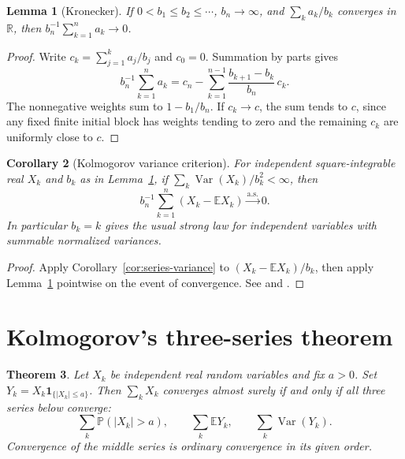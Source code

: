 \documentclass[11pt,oneside,openany]{book}
\newcommand{\Prob}{\mathbb{P}}
\newcommand{\E}{\mathbb{E}}
\newcommand{\R}{\mathbb{R}}
\DeclareMathOperator{\Var}{Var}
\newcommand{\ind}{\mathbf{1}}
\newcommand{\asto}{\xrightarrow{\mathrm{a.s.}}}
\theoremstyle{plain}
\newtheorem{theorem}{Theorem}[chapter]
\newtheorem{lemma}[theorem]{Lemma}
\newtheorem{corollary}[theorem]{Corollary}
\theoremstyle{definition}
\theoremstyle{remark}
\begin{document}
\begin{lemma}[Kronecker]\label{lem:kronecker}
If \(0<b_1\le b_2\le\cdots\), \(b_n\to\infty\), and
\(\sum_k a_k/b_k\) converges in \(\R\), then
\(b_n^{-1}\sum_{k=1}^n a_k\to0\).
\end{lemma}
\begin{proof}
Write \(c_k=\sum_{j=1}^k a_j/b_j\) and \(c_0=0\).
Summation by parts gives
\[
 b_n^{-1}\sum_{k=1}^n a_k
 =c_n-\sum_{k=1}^{n-1}\frac{b_{k+1}-b_k}{b_n}\,c_k .
\]
The nonnegative weights sum to \(1-b_1/b_n\).
If \(c_k\to c\), the sum tends to \(c\), since any fixed finite
initial block has weights tending to zero and the remaining
\(c_k\) are uniformly close to \(c\).
\end{proof}

\begin{corollary}[Kolmogorov variance criterion]\label{cor:variance-slln}
For independent square-integrable real \(X_k\) and \(b_k\) as in
Lemma~\ref{lem:kronecker}, if
\(\sum_k \Var(X_k)/b_k^2<\infty\), then
\[
 b_n^{-1}\sum_{k=1}^n(X_k-\E X_k)\asto0 .
\]
In particular \(b_k=k\) gives the usual strong law for independent
variables with summable normalized variances.
\end{corollary}
\begin{proof}
Apply Corollary~\ref{cor:series-variance} to
\((X_k-\E X_k)/b_k\), then apply Lemma~\ref{lem:kronecker} pointwise
on the event of convergence. See
\cite[Lemma 5.21 and Corollary 5.22, pp.~112--113]{Kallenberg}
and \cite[Theorem 2.5.9]{Durrett}.
\end{proof}

\section{Kolmogorov's three-series theorem}
\label{p08-05}

\begin{theorem}\label{thm:three-series}
Let \(X_k\) be independent real random variables and fix \(a>0\).
Set \(Y_k=X_k\ind_{\{|X_k|\le a\}}\). Then
\(\sum_kX_k\) converges almost surely if and only if all three
series below converge:
\[
 \sum_k\Prob(|X_k|>a),\qquad
 \sum_k \E Y_k,\qquad
 \sum_k \Var(Y_k).
\]
Convergence of the middle series is ordinary convergence in its given
order.
\end{theorem}
\end{document}
